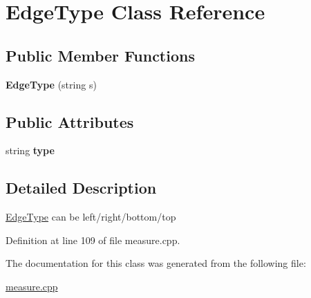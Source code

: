 \hypertarget{classEdgeType}{}\section{Edge\+Type Class Reference}
\label{classEdgeType}
\subsection*{Public Member Functions}
\begin{DoxyCompactItemize}
\item 
\mbox{\label{classEdgeType_ae51644845cd7198b12f9cc20cd2b4589}} 
{\bfseries Edge\+Type} (string s)
\end{DoxyCompactItemize}
\subsection*{Public Attributes}
\begin{DoxyCompactItemize}
\item 
\mbox{\label{classEdgeType_a2878d29fd9a71bac482e065c72fda811}} 
string {\bfseries type}
\end{DoxyCompactItemize}


\subsection{Detailed Description}
\hyperlink{classEdgeType}{Edge\+Type} can be left/right/bottom/top 

Definition at line 109 of file measure.\+cpp.



The documentation for this class was generated from the following file\+:\begin{DoxyCompactItemize}
\item 
\hyperlink{measure_8cpp}{measure.\+cpp}\end{DoxyCompactItemize}
